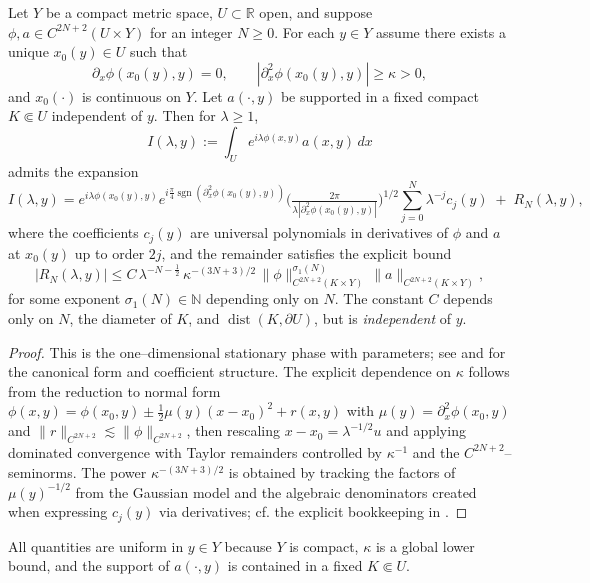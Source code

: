 \begin{theorem}
\label{thm:SP-param}
Let $Y$ be a compact metric space, $U\subset \mathbb{R}$ open, and suppose $\phi,a\in C^{2N+2}(U\times Y)$ for an integer $N\ge0$. For each $y\in Y$ assume there exists a unique $x_0(y)\in U$ such that
\[
\partial_x\phi(x_0(y),y)=0,\qquad |\partial_x^2\phi(x_0(y),y)| \ge \kappa>0,
\]
and $x_0(\cdot)$ is continuous on $Y$. Let $a(\cdot,y)$ be supported in a fixed compact $K\Subset U$ independent of $y$. Then for $\lambda\ge1$,
\[
I(\lambda,y):=\int_U e^{i\lambda \phi(x,y)} a(x,y)\,dx
\]
admits the expansion
\[
I(\lambda,y)= e^{i\lambda \phi(x_0(y),y)} e^{i\frac{\pi}{4}\operatorname{sgn}(\partial_x^2\phi(x_0(y),y))}
\Big(\tfrac{2\pi}{\lambda|\partial_x^2\phi(x_0(y),y)|}\Big)^{1/2}
\sum_{j=0}^{N} \lambda^{-j} c_j(y) \; + \; R_N(\lambda,y),
\]
where the coefficients $c_j(y)$ are universal polynomials in derivatives of $\phi$ and $a$ at $x_0(y)$ up to order $2j$, and the remainder satisfies the explicit bound
\[
|R_N(\lambda,y)| \le C\, \lambda^{-N-\frac12}\, \kappa^{-(3N+3)/2}\,
\big\|\phi\big\|_{C^{2N+2}(K\times Y)}^{\sigma_1(N)}\,
\big\|a\big\|_{C^{2N+2}(K\times Y)} ,
\]
for some exponent $\sigma_1(N)\in \mathbb{N}$ depending only on $N$. The constant $C$ depends only on $N$, the diameter of $K$, and $\operatorname{dist}(K,\partial U)$, but is \emph{independent} of $y$.
\end{theorem}

\begin{proof}
This is the one–dimensional stationary phase with parameters; see \cite[Thm.~7.7.5]{HormanderI} and \cite[App.~A]{Zworski} for the canonical form and coefficient structure. The explicit dependence on $\kappa$ follows from the reduction to normal form $\phi(x,y)=\phi(x_0,y)\pm \tfrac12 \mu(y)(x-x_0)^2 + r(x,y)$ with $\mu(y)=\partial_x^2\phi(x_0,y)$ and $\|r\|_{C^{2N+2}}\lesssim \|\phi\|_{C^{2N+2}}$, then rescaling $x-x_0=\lambda^{-1/2} u$ and applying dominated convergence with Taylor remainders controlled by $\kappa^{-1}$ and the $C^{2N+2}$–seminorms. The power $\kappa^{-(3N+3)/2}$ is obtained by tracking the factors of $\mu(y)^{-1/2}$ from the Gaussian model and the algebraic denominators created when expressing $c_j(y)$ via derivatives; cf. the explicit bookkeeping in \cite[§7.7]{HormanderI}.
\end{proof}

\begin{remark}
All quantities are uniform in $y\in Y$ because $Y$ is compact, $\kappa$ is a global lower bound, and the support of $a(\cdot,y)$ is contained in a fixed $K\Subset U$.
\end{remark}

